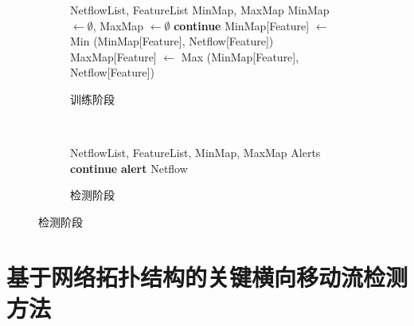 {\begin{figure}[!htbp]
    \centering
    \begin{subfigure}[b]{1.0\textwidth}
        \hrulefill
        \begin{algorithmic}[1]
            \Require NetflowList, FeatureList
            \Ensure MinMap, MaxMap
                \State MinMap $\gets \emptyset$, MaxMap $\gets \emptyset$
                        \State \textbf{continue}
                    \EndIf
                        \State MinMap[Feature] $\gets $ Min (MinMap[Feature], Netflow[Feature])
                        \State MaxMap[Feature] $\gets $ Max (MinMap[Feature], Netflow[Feature])
                    \EndFor
                \EndFor
            \EndFunction
            \end{algorithmic}
        \hrulefill
        \caption{训练阶段}
    \end{subfigure}
    \\
    \begin{subfigure}[b]{1.0\textwidth}
        \hrulefill
            \begin{algorithmic}[1]
            \Require NetflowList, FeatureList, MinMap, MaxMap
            \Ensure Alerts
                        \State \textbf{continue}
                    \EndIf
                            \State \textbf{alert} Netflow
                        \EndIf
                    \EndFor
                \EndFor
            \EndFunction
            \end{algorithmic}
        \hrulefill
        \caption{检测阶段}
    \end{subfigure}
    \label{fig:detect-code}
\end{figure}

\section{基于网络拓扑结构的关键横向移动流检测方法}

}
